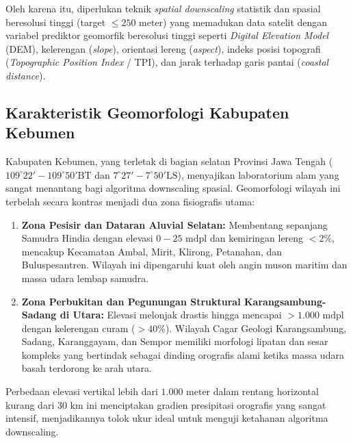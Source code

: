 \documentclass[11pt,a4paper]{article}
\begin{document}
Oleh karena itu, diperlukan teknik \textit{spatial downscaling} statistik dan spasial beresolusi tinggi (target $\le 250\text{ meter}$) yang memadukan data satelit dengan variabel prediktor geomorfik beresolusi tinggi seperti \textit{Digital Elevation Model} (DEM), kelerengan (\textit{slope}), orientasi lereng (\textit{aspect}), indeks posisi topografi (\textit{Topographic Position Index} / TPI), dan jarak terhadap garis pantai (\textit{coastal distance}).

\subsection{Karakteristik Geomorfologi Kabupaten Kebumen}
Kabupaten Kebumen, yang terletak di bagian selatan Provinsi Jawa Tengah ($109^\circ 22' - 109^\circ 50'\text{BT}$ dan $7^\circ 27' - 7^\circ 50'\text{LS}$), menyajikan laboratorium alam yang sangat menantang bagi algoritma downscaling spasial. Geomorfologi wilayah ini terbelah secara kontras menjadi dua zona fisiografis utama:
\begin{enumerate}
    \item \textbf{Zona Pesisir dan Dataran Aluvial Selatan:} Membentang sepanjang Samudra Hindia dengan elevasi $0 - 25\text{ mdpl}$ dan kemiringan lereng $< 2\%$, mencakup Kecamatan Ambal, Mirit, Klirong, Petanahan, dan Buluspesantren. Wilayah ini dipengaruhi kuat oleh angin muson maritim dan massa udara lembap samudra.
    \item \textbf{Zona Perbukitan dan Pegunungan Struktural Karangsambung-Sadang di Utara:} Elevasi melonjak drastis hingga mencapai $> 1.000\text{ mdpl}$ dengan kelerengan curam ($> 40\%$). Wilayah Cagar Geologi Karangsambung, Sadang, Karanggayam, dan Sempor memiliki morfologi lipatan dan sesar kompleks yang bertindak sebagai dinding orografis alami ketika massa udara basah terdorong ke arah utara.
\end{enumerate}

Perbedaan elevasi vertikal lebih dari $1.000\text{ meter}$ dalam rentang horizontal kurang dari $30\text{ km}$ ini menciptakan gradien presipitasi orografis yang sangat intensif, menjadikannya tolok ukur ideal untuk menguji ketahanan algoritma downscaling.
\end{document}
